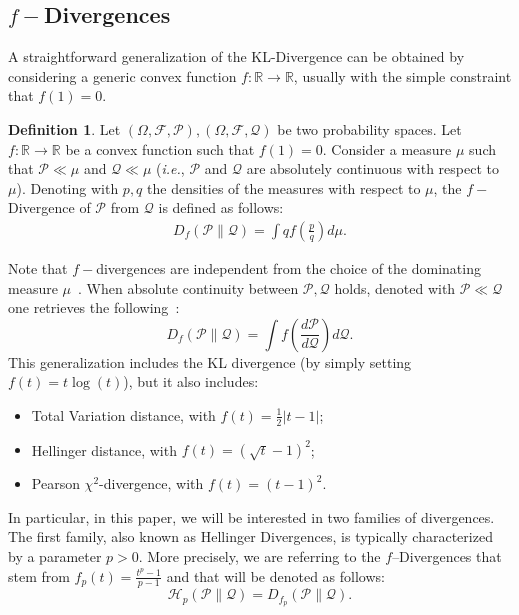 \documentclass[conference]{IEEEtran}
\theoremstyle{plain}
\theoremstyle{definition}
\newtheorem{definition}{Definition}
\theoremstyle{remark}
\newcommand{\Pm}{\mathcal{P}}
\newcommand{\Q}{\mathcal{Q}}
\newcommand{\F}{\mathcal{F}}
\begin{document}
\subsection{$f-$Divergences}\label{fDivergence}
A straightforward generalization of the KL-Divergence can be obtained by considering a generic convex function $f:\mathbb{R}\to \mathbb{R}$, usually with the simple constraint that $f(1)=0$. %
\begin{definition}

	Let $(\Omega,\F,\Pm),(\Omega,\F,\Q)$ be two probability spaces. Let $f:\mathbb{R}\to \mathbb{R}$ be a convex function such that $f(1)=0$. Consider a measure $\mu$ such that $\Pm\ll\mu$ and $\Q\ll\mu$ (\textit{i.e.}, $\Pm$ and $\Q$ are absolutely continuous with respect to $\mu$). Denoting with $p,q$ the densities of the measures with respect to $\mu$, the $f-$Divergence of $\Pm$ from $\Q$ is defined as follows:
	\begin{align}
	\label{defFDiv}
	D_f(\Pm\|\Q)=\int q f\left(\frac{p}{q}\right) d\mu.
	\end{align}    
\end{definition}
Note that $f-$divergences are independent from the choice of the dominating measure $\mu$~\cite{fDiv1}. When absolute continuity between $\Pm,\Q$ holds, denoted with $\Pm\ll\Q$ one retrieves the following~\cite{fDiv1}:
\begin{equation}
    D_f(\Pm\|\Q)= \int f\left(\frac{d\Pm}{d\Q}\right)d\Q.
\end{equation}
This generalization includes the KL divergence (by simply setting $f(t)=t\log(t)$), but it also includes:
\begin{itemize}
	\item Total Variation distance, with $f(t)=\frac12|t-1|$;
	\item Hellinger distance, with $f(t)=(\sqrt{t}-1)^2$;
	\item Pearson $\chi^2$-divergence, with $f(t)=(t-1)^2$.
\end{itemize}
In particular, in this paper, we will be interested in two families of divergences. The first family, also known as Hellinger Divergences, is typically characterized by a parameter $p>0$. More precisely, we are referring to the $f$--Divergences that stem from $f_p(t)= \frac{t^p-1}{p-1}$ and that will be denoted as follows:
\begin{equation}
    \mathcal{H}_p(\Pm\|\Q)= D_{f_p}(\Pm\|\Q).
\end{equation}
\end{document}
